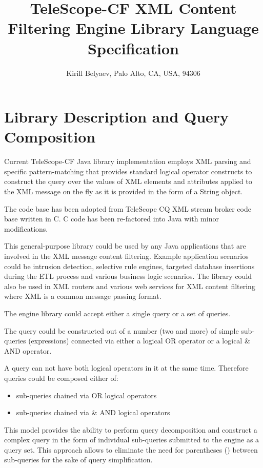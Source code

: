\documentclass[11pt]{article} %
\title{TeleScope-CF XML Content Filtering Engine Library Language  Specification}
\author{Kirill Belyaev, Palo Alto, CA, USA, 94306}
\begin{document}
\maketitle

\section{Library Description and Query Composition}

	Current TeleScope-CF Java library implementation employs XML parsing and specific pattern-matching that provides standard logical operator constructs to construct the query over the values of XML elements and attributes applied to the XML message on the fly as it is provided in the form of a String object.
	
	The code base has been adopted from TeleScope CQ XML stream broker code base written in C. C code has been re-factored into Java with minor modifications. 

This general-purpose library could be used by any Java applications that are involved in the XML message content filtering. Example application scenarios could be intrusion detection, selective rule engines, targeted database insertions during the ETL process and various business logic scenarios.  The library could also be used in XML routers and various web services for XML content filtering where XML is a common message passing format.   

The engine library could accept either a single query or a set of queries.

The query could be constructed out of a number (two and more) of simple sub-queries (expressions) connected via either a logical \textbar \space OR operator or a logical \& \space AND operator. 

A query can not have both logical operators in it at the same time.
Therefore queries could be composed either of:

\begin{itemize}
\item{sub-queries chained via \textbar \space OR logical operators}
\item{sub-queries chained via \& \space AND logical operators}
\end{itemize}


This model provides the ability to perform query decomposition and construct a complex query in the form of individual sub-queries submitted to the engine as a query set. This approach allows to eliminate the need for parentheses () between sub-queries for the sake of query simplification. 
\end{document}
